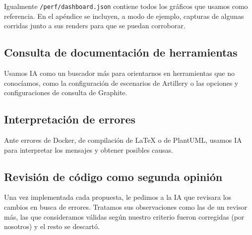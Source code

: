     Igualmente \texttt{/perf/dashboard.json} contiene todos los gráficos que usamos como referencia.
    En el apéndice se incluyen, a modo de ejemplo, capturas de algunas corridas junto a sus renders para que se puedan corroborar.

    \subsection{Consulta de documentación de herramientas}
    \label{sec:uso_de_ia_documentacion}

    Usamos IA como un buscador más para orientarnos en herramientas que no conocíamos, como la configuración de escenarios de Artillery o las opciones y configuraciones de consulta de Graphite.

    \subsection{Interpretación de errores}
    \label{sec:uso_de_ia_errores}

    Ante errores de Docker, de compilación de \LaTeX{} o de PlantUML, usamos IA para interpretar los mensajes y obtener posibles causas.

    \subsection{Revisión de código como segunda opinión}
    \label{sec:uso_de_ia_revision_de_codigo}

    Una vez implementada cada propuesta, le pedimos a la IA que revisara los cambios en busca de errores.
    Tratamos sus observaciones como las de un revisor más, las que consideramos válidas según nuestro criterio fueron corregidas (por nosotros) y el resto se descartó.
